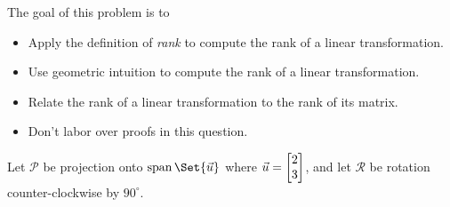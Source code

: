 	\question
	\begin{annotation}
		\begin{goals}

			The goal of this problem is to
			\begin{itemize}
				\item Apply the definition of \emph{rank} to compute the rank of a linear transformation.
				\item Use geometric intuition to compute the rank of a linear transformation.
				\item Relate the rank of a linear transformation to the rank of its matrix.
			\end{itemize}
		\end{goals}

		\begin{notes}
			\begin{itemize}
				\item Don't labor over proofs in this question.
			\end{itemize}
		\end{notes}
	\end{annotation}
	\label{rankOfMatricesAndTransformations}
	Let $\mathcal P$ be projection onto $\Span\Set{\vec u}$ where $\vec u=\mat{2\\3}$,
	and let $\mathcal R$ be rotation counter-clockwise by $90^\circ$.
